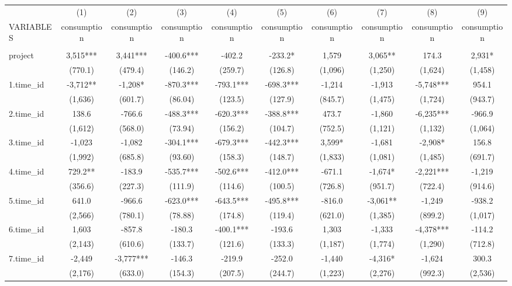 \documentclass[]{article}
\begin{document}
\begin{tabular}{lccccccccc} \hline
 & (1) & (2) & (3) & (4) & (5) & (6) & (7) & (8) & (9) \\
VARIABLES & consumption & consumption & consumption & consumption & consumption & consumption & consumption & consumption & consumption \\ \hline
 &  &  &  &  &  &  &  &  &  \\
project & 3,515*** & 3,441*** & -400.6*** & -402.2 & -233.2* & 1,579 & 3,065** & 174.3 & 2,931* \\
 & (770.1) & (479.4) & (146.2) & (259.7) & (126.8) & (1,096) & (1,250) & (1,624) & (1,458) \\
1.time\_id & -3,712** & -1,208* & -870.3*** & -793.1*** & -698.3*** & -1,214 & -1,913 & -5,748*** & 954.1 \\
 & (1,636) & (601.7) & (86.04) & (123.5) & (127.9) & (845.7) & (1,475) & (1,724) & (943.7) \\
2.time\_id & 138.6 & -766.6 & -488.3*** & -620.3*** & -388.8*** & 473.7 & -1,860 & -6,235*** & -966.9 \\
 & (1,612) & (568.0) & (73.94) & (156.2) & (104.7) & (752.5) & (1,121) & (1,132) & (1,064) \\
3.time\_id & -1,023 & -1,082 & -304.1*** & -679.3*** & -442.3*** & 3,599* & -1,681 & -2,908* & 156.8 \\
 & (1,992) & (685.8) & (93.60) & (158.3) & (148.7) & (1,833) & (1,081) & (1,485) & (691.7) \\
4.time\_id & 729.2** & -183.9 & -535.7*** & -502.6*** & -412.0*** & -671.1 & -1,674* & -2,221*** & -1,219 \\
 & (356.6) & (227.3) & (111.9) & (114.6) & (100.5) & (726.8) & (951.7) & (722.4) & (914.6) \\
5.time\_id & 641.0 & -966.6 & -623.0*** & -643.5*** & -495.8*** & -816.0 & -3,061** & -1,249 & -938.2 \\
 & (2,566) & (780.1) & (78.88) & (174.8) & (119.4) & (621.0) & (1,385) & (899.2) & (1,017) \\
6.time\_id & 1,603 & -857.8 & -180.3 & -400.1*** & -193.6 & 1,303 & -1,333 & -4,378*** & -114.2 \\
 & (2,143) & (610.6) & (133.7) & (121.6) & (133.3) & (1,187) & (1,774) & (1,290) & (712.8) \\
7.time\_id & -2,449 & -3,777*** & -146.3 & -219.9 & -252.0 & -1,440 & -4,316* & -1,624 & 300.3 \\
 & (2,176) & (633.0) & (154.3) & (207.5) & (244.7) & (1,223) & (2,276) & (992.3) & (2,536) \\

\end{tabular}
\end{document}
